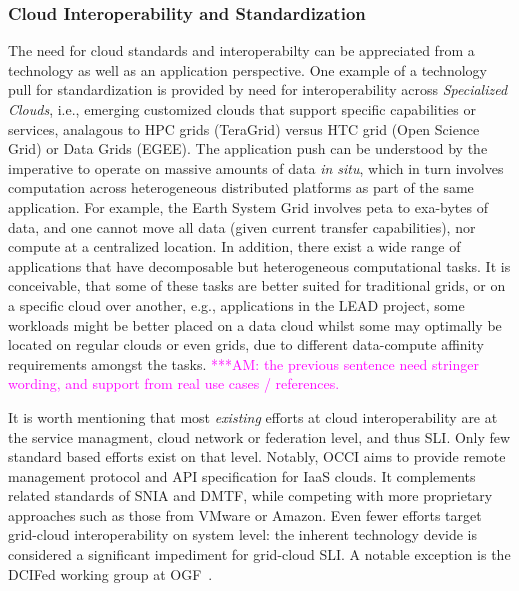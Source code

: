 \documentclass[10pt,conference,final,letterpaper,twoside,twocolumn,]{IEEEtran}
\newcommand{\amnote}[1]{  {\textcolor{magenta} {***AM: #1}}}
\newcommand{\amnote}[1]{}
\newcommand{\I}[1]{\textit{#1}}
\begin{document}
 \subsubsection*{Cloud Interoperability and Standardization}

 The need for cloud standards and interoperabilty can be appreciated
 from a technology as well as an application perspective. One example
 of a technology pull for standardization is provided by need for
 interoperability across {\it Specialized Clouds}, i.e., emerging
 customized clouds that support specific capabilities or services,
 analagous to HPC grids (TeraGrid) versus HTC grid (Open Science Grid)
 or Data Grids (EGEE).  The application push can be understood by the
 imperative to operate on massive amounts of data {\it in situ}, which
 in turn involves computation across heterogeneous distributed
 platforms as part of the same application.  For example, the Earth
 System Grid involves peta to exa-bytes of data, and one cannot move
 all data (given current transfer capabilities), nor compute at a
 centralized location.  In addition, there exist a wide range of
 applications that have decomposable but heterogeneous computational
 tasks. It is conceivable, that some of these tasks are better suited
 for traditional grids, or on a specific cloud over another, e.g.,
 applications in the LEAD project, some workloads might be better
 placed on a data cloud whilst some may optimally be located on
 regular clouds or even grids, due to different data-compute affinity
 requirements amongst the tasks. \amnote{the previous sentence need
 stringer wording, and support from real use cases / references.}

 It is worth mentioning that most \I{existing} efforts at cloud
 interoperability are at the service managment, cloud network or
 federation level, and thus SLI.  Only few standard based efforts
 exist on that level.  Notably, OCCI aims to provide remote management
 protocol and API specification for IaaS clouds.  It complements
 related standards of SNIA and DMTF, while competing with more
 proprietary approaches such as those from VMware or Amazon.  Even
 fewer efforts target grid-cloud interoperability on system level: the
 inherent technology devide is considered a significant impediment for
 grid-cloud SLI.  A notable exception is the DCIFed working group at
 OGF~\cite{dcifed-www}.
 
 
\end{document}
